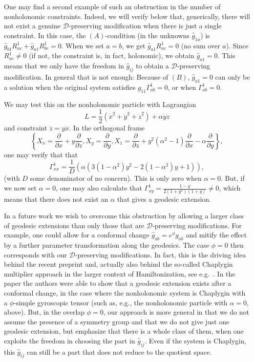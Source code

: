 \documentclass[11pt]{article}
\def\fpd#1#2{{\displaystyle\frac{\partial #1}{\partial #2}}}
\def\D{{\mathcal D}}
\begin{document}
One may find a second example of such an obstruction in the number of nonholonomic constraints. Indeed, we will  verify below that, generically, there will not exist a genuine ${\mathcal D}$-preserving modification when there is just a single  constraint.  In this case, the $(A)$-condition (in the unknowns  ${\hat g}_{1a}$) is ${\hat g}_{b1}R^1_{ac}+{\hat g}_{a1}R^1_{bc} = 0$. When we set $a=b$, we get ${\hat g}_{a1}R^1_{ac} = 0$ (no sum over $a$). Since $R^1_{ac} \neq 0$ (if not, the constraint is, in fact, holonomic), we obtain ${\hat g}_{a1}=0$. This means that we only have the freedom in ${\hat g}_{ij}$ to obtain a ${\mathcal D}$-preserving modification. In general that is not enough: Because of $(B)$, ${\hat g}_{a1}=0$ can only be a solution when the original system satisfies $g_{11}\Gamma^1_{ab} =0$, or when $\Gamma^1_{ab} =0$. 

We may test this on the nonholonomic particle with Lagrangian  \[
L = \frac{1}{2}({\dot x}^2+{\dot y}^2 +{\dot z}^2) + \alpha {\dot y}{\dot z}
\]
and  constraint  ${\dot z} = y{\dot x}$. In the orthogonal frame \[\left\{X_x = \fpd{}{x} + y \fpd{}{z}, X_y = \fpd{}{y}, X_1 = \fpd{}{z}+y^2(\alpha^2-1)\fpd{}{x} -\alpha \fpd{}{y} \right\},\]
one may verify that that
\[
\Gamma^1_{xx} = \frac{1}{D}(\alpha (3(1-\alpha^2)y^2 - 2 (1-\alpha^2) y +1) ), 
\]
(with $D$ some denominator of no concern). This is only zero when $\alpha=0$. But, if we now set $\alpha=0$,  one may also calculate that 
$\displaystyle 
\Gamma^1_{xy} = \frac{1-y}{2(1+y^2)(1+y)} \neq 0$,
which means that there does not exist an  $\alpha$ that gives a geodesic extension. 

In a future work we wish to overcome this obstruction by allowing a larger class of geodesic extensions than only those that are $\mathcal D$-preserving modifications.  For example, one could allow  for a conformal change ${\hat g}_{ab} =e^\phi g_{ab}$ and mitify the effect by a further parameter transformation along the geodesics. The case $\phi=0$ then corresponds with our $\D$-preserving modifications. In fact, this is the driving idea behind the recent preprint \cite{recent} and, actually also behind the so-called Chaplygin multiplier approach in the larger context of Hamiltonization, see e.g.\ \cite{Tom,luis}. In the paper \cite{recent} the authors were able to show that a geodesic extension exists after a conformal change, in the case where the nonholonomic system is Chaplygin with a  $\phi$-simple gyroscopic tensor (such as, e.g.,  the nonholonomic particle  with $\alpha=0$, above). But, in the overlap  $\phi=0$, our approach is more general in that we  do not assume the presence of a symmetry group and that we do not give just one  geodesic extension, but emphasize that there is a whole class of them, when one exploits the freedom in choosing the part in  ${\hat g}_{ij}$. Even if the system is Chaplygin, this ${\hat g}_{ij}$ can still be a part that does not reduce to the quotient space. 
\end{document}

